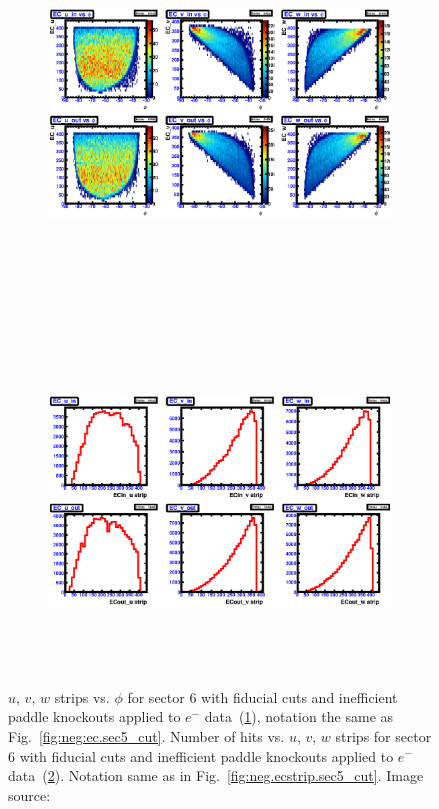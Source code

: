 \begin{figure}[!ht]
  \centering
  \begin{subfigure}[b]{\figwidth}
  \includegraphics[width=\figwidth, height=3.5in,valign=c]{figures/calib/ec/pim_ecuvw_phi_afterGeoFid_sec6.eps}\caption{}\label{fig:EC_III_VI}
  \end{subfigure}%
  \\
  \begin{subfigure}[b]{\figwidth}
  \includegraphics[width=\figwidth, height=3.5in,valign=c]{figures/calib/ec/pim_ecuvw_afterGeoFid_sec6.eps}\caption{}\label{fig:EC_IV_VI}
  \end{subfigure}%
      \caption { $u$, $v$, $w$ strips vs. $\phi$ for sector 6 with fiducial cuts and inefficient paddle knockouts applied to $e^-$ data~(\ref{fig:EC_III_VI}), notation the same as Fig.~\ref{fig:neg:ec.sec5_cut}. Number of hits vs.  $u$, $v$, $w$ strips for sector 6 with fiducial cuts and inefficient paddle knockouts applied to $e^-$ data~(\ref{fig:EC_IV_VI}). Notation same as in Fig.~\ref{fig:neg.ecstrip.sec5_cut}. Image source:~\cite{clas.thesis.kunkel}}
        \label{fig:EC_cut_VI}
\end{figure}


